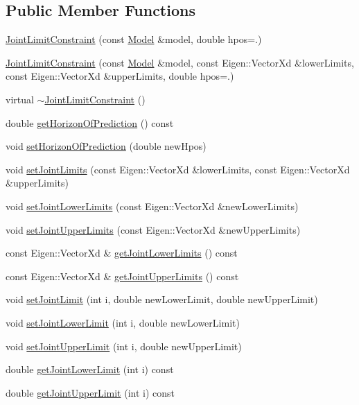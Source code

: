 \subsection*{Public Member Functions}
\begin{DoxyCompactItemize}
\item 
\hyperlink{classocra_1_1JointLimitConstraint_af81ce81f8c90e5bf4272cc6ab592ae69}{Joint\+Limit\+Constraint} (const \hyperlink{classocra_1_1Model}{Model} \&model, double hpos=.)
\item 
\hyperlink{classocra_1_1JointLimitConstraint_a8e767f982c1d41192b03a0aafbd3ced5}{Joint\+Limit\+Constraint} (const \hyperlink{classocra_1_1Model}{Model} \&model, const Eigen\+::\+Vector\+Xd \&lower\+Limits, const Eigen\+::\+Vector\+Xd \&upper\+Limits, double hpos=.)
\item 
virtual \hyperlink{classocra_1_1JointLimitConstraint_a5cb58e4dd8fe8c313a50e8601306e0dd}{$\sim$\+Joint\+Limit\+Constraint} ()
\item 
double \hyperlink{classocra_1_1JointLimitConstraint_af7d78cabe18ed94eb2f2efa61efa8516}{get\+Horizon\+Of\+Prediction} () const
\item 
void \hyperlink{classocra_1_1JointLimitConstraint_a6903c0e8ea1024dd050b604e741634a6}{set\+Horizon\+Of\+Prediction} (double new\+Hpos)
\item 
void \hyperlink{classocra_1_1JointLimitConstraint_ab2dcfcc6420510ddc291dbae83e38c40}{set\+Joint\+Limits} (const Eigen\+::\+Vector\+Xd \&lower\+Limits, const Eigen\+::\+Vector\+Xd \&upper\+Limits)
\item 
void \hyperlink{classocra_1_1JointLimitConstraint_a1ef49a88ac2646a45bac289a9b623b8f}{set\+Joint\+Lower\+Limits} (const Eigen\+::\+Vector\+Xd \&new\+Lower\+Limits)
\item 
void \hyperlink{classocra_1_1JointLimitConstraint_ad019e751fdb343ea0bd29efab8f4d5d2}{set\+Joint\+Upper\+Limits} (const Eigen\+::\+Vector\+Xd \&new\+Upper\+Limits)
\item 
const Eigen\+::\+Vector\+Xd \& \hyperlink{classocra_1_1JointLimitConstraint_a207e245abf812538eacf10fb9d9e704d}{get\+Joint\+Lower\+Limits} () const
\item 
const Eigen\+::\+Vector\+Xd \& \hyperlink{classocra_1_1JointLimitConstraint_a5055bb2f327a4fef0b43a3e92309e16f}{get\+Joint\+Upper\+Limits} () const
\item 
void \hyperlink{classocra_1_1JointLimitConstraint_a774667152d3cd376ef3101a4db889c3f}{set\+Joint\+Limit} (int i, double new\+Lower\+Limit, double new\+Upper\+Limit)
\item 
void \hyperlink{classocra_1_1JointLimitConstraint_abeac7915f147b24c8afd43ba44ce000c}{set\+Joint\+Lower\+Limit} (int i, double new\+Lower\+Limit)
\item 
void \hyperlink{classocra_1_1JointLimitConstraint_a4dd11a29e4ba9655efa588292335559d}{set\+Joint\+Upper\+Limit} (int i, double new\+Upper\+Limit)
\item 
double \hyperlink{classocra_1_1JointLimitConstraint_a4140ce4adf0c699b65ab1f9d33b4d487}{get\+Joint\+Lower\+Limit} (int i) const
\item 
double \hyperlink{classocra_1_1JointLimitConstraint_af08f9fe570f139055dc609e34d44e062}{get\+Joint\+Upper\+Limit} (int i) const
\end{DoxyCompactItemize}
